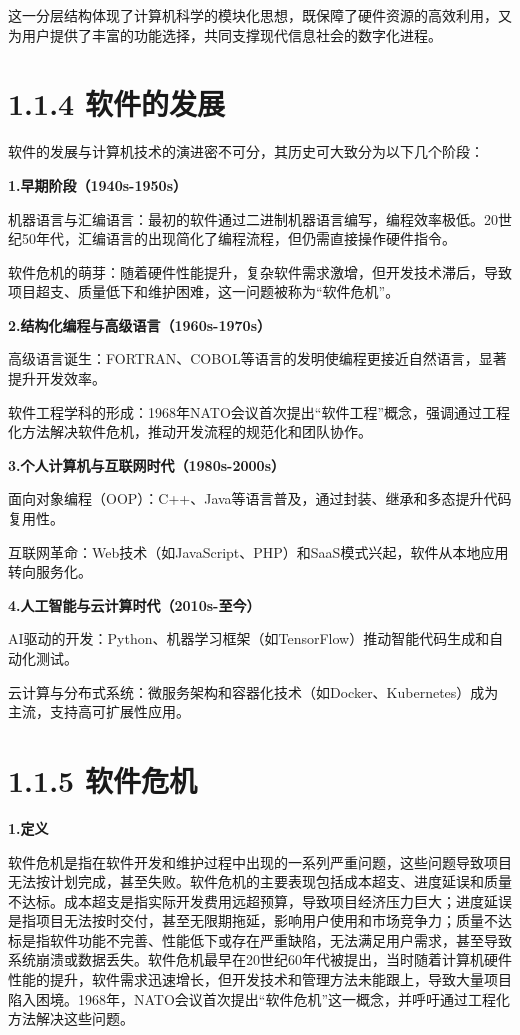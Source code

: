 \documentclass[12pt,a4paper]{ctexbook}
\begin{document}
这一分层结构体现了计算机科学的模块化思想，既保障了硬件资源的高效利用，又为用户提供了丰富的功能选择，共同支撑现代信息社会的数字化进程。


\section{1.1.4 软件的发展}\label{ux8f6fux4ef6ux7684ux53d1ux5c55}

软件的发展与计算机技术的演进密不可分，其历史可大致分为以下几个阶段：

\textbf{1.早期阶段（1940s-1950s）}

机器语言与汇编语言：最初的软件通过二进制机器语言编写，编程效率极低。20世纪50年代，汇编语言的出现简化了编程流程，但仍需直接操作硬件指令。

软件危机的萌芽：随着硬件性能提升，复杂软件需求激增，但开发技术滞后，导致项目超支、质量低下和维护困难，这一问题被称为``软件危机''。

\textbf{2.结构化编程与高级语言（1960s-1970s）}

高级语言诞生：FORTRAN、COBOL等语言的发明使编程更接近自然语言，显著提升开发效率。

软件工程学科的形成：1968年NATO会议首次提出``软件工程''概念，强调通过工程化方法解决软件危机，推动开发流程的规范化和团队协作。

\textbf{3.个人计算机与互联网时代（1980s-2000s）}

面向对象编程（OOP）：C++、Java等语言普及，通过封装、继承和多态提升代码复用性。

互联网革命：Web技术（如JavaScript、PHP）和SaaS模式兴起，软件从本地应用转向服务化。

\textbf{4.人工智能与云计算时代（2010s-至今）}

AI驱动的开发：Python、机器学习框架（如TensorFlow）推动智能代码生成和自动化测试。

云计算与分布式系统：微服务架构和容器化技术（如Docker、Kubernetes）成为主流，支持高可扩展性应用。


\section{1.1.5 软件危机}\label{ux8f6fux4ef6ux5371ux673a}

\textbf{1.定义}

软件危机是指在软件开发和维护过程中出现的一系列严重问题，这些问题导致项目无法按计划完成，甚至失败。软件危机的主要表现包括成本超支、进度延误和质量不达标。成本超支是指实际开发费用远超预算，导致项目经济压力巨大；进度延误是指项目无法按时交付，甚至无限期拖延，影响用户使用和市场竞争力；质量不达标是指软件功能不完善、性能低下或存在严重缺陷，无法满足用户需求，甚至导致系统崩溃或数据丢失。软件危机最早在20世纪60年代被提出，当时随着计算机硬件性能的提升，软件需求迅速增长，但开发技术和管理方法未能跟上，导致大量项目陷入困境。1968年，NATO会议首次提出``软件危机''这一概念，并呼吁通过工程化方法解决这些问题。
\end{document}
